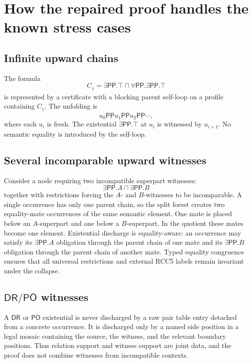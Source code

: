 \documentclass[11pt]{article}
\newcommand{\DR}{\mathsf{DR}}
\newcommand{\PO}{\mathsf{PO}}
\newcommand{\PP}{\mathsf{PP}}
\begin{document}
\section{How the repaired proof handles the known stress cases}

\subsection{Infinite upward chains}

The formula
\[
  C_\uparrow=\exists\PP.\top\sqcap\forall\PP.\exists\PP.\top
\]
is represented by a certificate with a blocking parent self-loop on a profile containing $C_\uparrow$.  The unfolding is
\[
  u_0\PP u_1\PP u_2\PP\cdots,
\]
where each $u_i$ is fresh.  The existential $\exists\PP.\top$ at $u_i$ is witnessed by $u_{i+1}$.  No semantic equality is introduced by the self-loop.

\subsection{Several incomparable upward witnesses}

Consider a node requiring two incompatible superpart witnesses:
\[
  \exists\PP.A\sqcap\exists\PP.B
\]
together with restrictions forcing the $A$- and $B$-witnesses to be incomparable.  A single occurrence has only one parent chain, so the split forest creates two equality-mate occurrences of the same semantic element.  One mate is placed below an $A$-superpart and one below a $B$-superpart.  In the quotient these mates become one element.  Existential discharge is equality-aware: an occurrence may satisfy its $\exists\PP.A$ obligation through the parent chain of one mate and its $\exists\PP.B$ obligation through the parent chain of another mate.  Typed equality congruence ensures that all universal restrictions and external RCC5 labels remain invariant under the collapse.

\subsection{$\DR/\PO$ witnesses}

A $\DR$ or $\PO$ existential is never discharged by a raw pair table entry detached from a concrete occurrence.  It is discharged only by a named side position in a legal mosaic containing the source, the witness, and the relevant boundary positions.  Thus relation support and witness support are joint data, and the proof does not combine witnesses from incompatible contexts.
\end{document}
